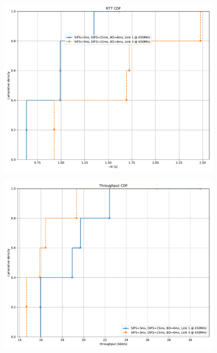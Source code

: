 \documentclass{article}
\begin{document}
\begin{figure}
	\includegraphics[width=\textwidth]{rb_dual/link_1_3/cdf/rtt_cdf}
\end{figure}

\begin{figure}
	\includegraphics[width=\textwidth]{rb_dual/link_1_3/cdf/throughput_cdf}
\end{figure}
\end{document}
